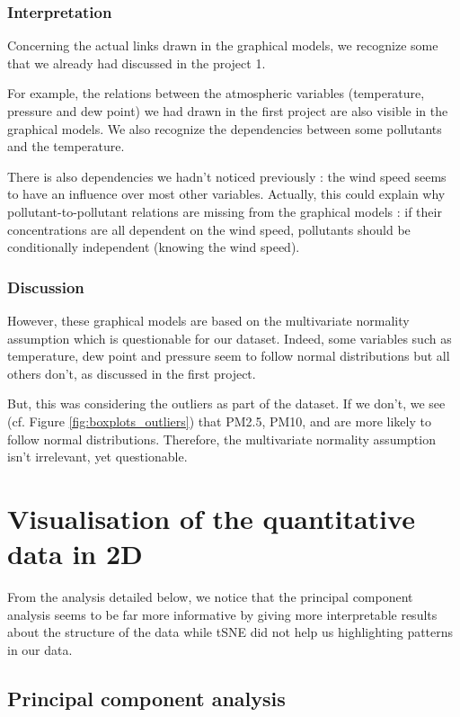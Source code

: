 \documentclass[a4paper, 12pt]{article}
\begin{document}
    \subsubsection*{Interpretation}
    
    Concerning the actual links drawn in the graphical models, we recognize some that we already had discussed in the project 1.
    
    For example, the relations between the atmospheric variables (temperature, pressure and dew point) we had drawn in the first project are also visible in the graphical models. We also recognize the dependencies between some pollutants and the temperature.
    
    There is also dependencies we hadn't noticed previously : the wind speed seems to have an influence over most other variables. Actually, this could explain why pollutant-to-pollutant relations are missing from the graphical models : if their concentrations are all dependent on the wind speed, pollutants should be conditionally independent (knowing the wind speed).
    
    \subsubsection*{Discussion}
    
    However, these graphical models are based on the multivariate normality assumption which is questionable for our dataset. Indeed, some variables such as temperature, dew point and pressure seem to follow normal distributions but all others don't, as discussed in the first project.

    But, this was considering the outliers as part of the dataset. If we don't, we see (cf. Figure \ref{fig:boxplots_outliers}) that PM2.5, PM10,  and  are more likely to follow normal distributions. Therefore, the multivariate normality assumption isn't irrelevant, yet questionable.
    
    \section{Visualisation of the quantitative data in 2D}

    From the analysis detailed below, we notice that the principal component analysis seems to be far more informative by giving more interpretable results about the structure of the data while tSNE did not help us highlighting patterns in our data.

    \subsection{Principal component analysis} \label{PCA}
\end{document}
